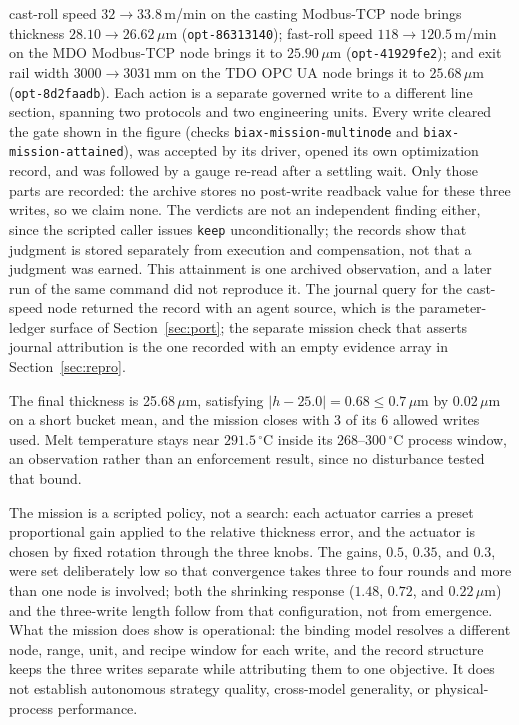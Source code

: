 cast-roll speed $32\rightarrow33.8$\,m/min on the casting Modbus-TCP node brings
thickness $28.10\rightarrow26.62\,\mu$m (\texttt{opt-86313140}); fast-roll speed
$118\rightarrow120.5$\,m/min on the MDO Modbus-TCP node brings it to
$25.90\,\mu$m (\texttt{opt-41929fe2}); and exit rail width $3000\rightarrow3031$\,mm
on the TDO OPC UA node brings it to $25.68\,\mu$m (\texttt{opt-8d2faadb}). Each
action is a separate governed write to a different line section, spanning
two protocols and two engineering units. Every write cleared the gate shown in the figure (checks \texttt{biax-mission-multinode} and \texttt{biax-mission-attained}), was accepted by its driver, opened its own
optimization record, and was followed by a gauge re-read after a settling wait. Only
those parts are recorded: the archive stores no post-write readback value for these
three writes, so we claim none. The verdicts are not an independent finding either,
since the scripted caller issues \texttt{keep} unconditionally; the records show
that judgment is stored separately from execution and compensation, not that a judgment was earned. This attainment is one archived observation, and a later run of the same command did not reproduce it. The journal query for the cast-speed node returned the record with an agent source, which is the parameter-ledger surface of Section~\ref{sec:port}; the separate mission check that asserts journal attribution is the one recorded with an empty evidence array in Section~\ref{sec:repro}.

The final thickness is 25.68\,$\mu$m, satisfying $|h-25.0|=0.68\leq0.7\,\mu$m by
$0.02\,\mu$m on a short bucket mean, and the mission closes with 3 of its 6 allowed
writes used. Melt temperature stays near $291.5\,^\circ$C inside its
268--300\,$^\circ$C process window, an observation rather than an enforcement
result, since no disturbance tested that bound.

The mission is a scripted policy, not a search: each actuator carries a preset
proportional gain applied to the relative thickness error, and the actuator is chosen
by fixed rotation through the three knobs. The gains, $0.5$, $0.35$, and $0.3$, were
set deliberately low so that convergence takes three to four rounds and more than one
node is involved; both the shrinking response ($1.48$, $0.72$, and $0.22\,\mu$m) and
the three-write length follow from that configuration, not from emergence. What the
mission does show is operational: the binding model resolves a different node,
range, unit, and recipe window for each write, and the record structure keeps the
three writes separate while attributing them to one objective. It does not establish
autonomous strategy quality, cross-model generality, or physical-process
performance.


